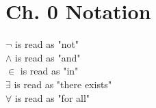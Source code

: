 \documentclass[11pt]{article}
\begin{document}
\section*{Ch. 0 Notation}

$\lnot$ is read as "not"\\
$\land$ is read as "and"\\
$\in$ is read as "in"\\
$\exists$ is read as "there exists"\\
$\forall$ is read as "for all"
\end{document}
